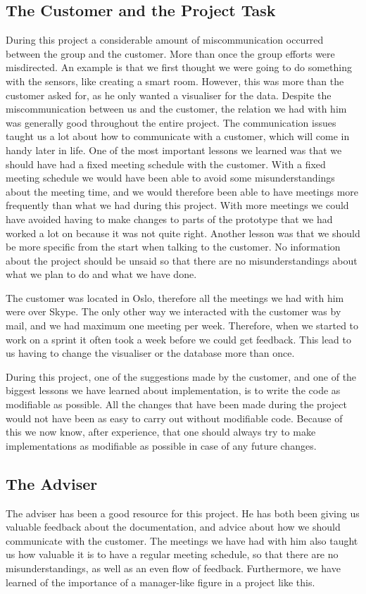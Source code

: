 \documentclass[../document]{subfiles}
\begin{document}
\subsection{The Customer and the Project Task}
During this project a considerable amount of miscommunication occurred between the group and the customer. More than once the group efforts were misdirected. An example is that we first thought we were going to do something with the sensors, like creating a smart room. However, this was more than the customer asked for, as he only wanted a visualiser for the data. Despite the miscommunication between us and the customer, the relation we had with him was generally good throughout the entire project. The communication issues taught us a lot about how to communicate with a customer, which will come in handy later in life. One of the most important lessons we learned was that we should have had a fixed meeting schedule with the customer. With a fixed meeting schedule we would have been able to avoid some misunderstandings about the meeting time, and we would therefore been able to have meetings more frequently than what we had during this project. With more meetings we could have avoided having to make changes to parts of the prototype that we had worked a lot on because it was not quite right. Another lesson was that we should be more specific from the start when talking to the customer. No information about the project should be unsaid so that there are no misunderstandings about what we plan to do and what we have done.   

The customer was located in Oslo, therefore all the meetings we had with him were over Skype. The only other way we interacted with the customer was by mail, and we had maximum one meeting per week. Therefore, when we started to work on a sprint it often took a week before we could get feedback. This lead to us having to change the visualiser or the database more than once. 

During this project, one of the suggestions made by the customer, and one of the biggest lessons we have learned about implementation, is to write the code as modifiable as possible. All the changes that have been made during the project would not have been as easy to carry out without modifiable code. Because of this we now know, after experience, that one should always try to make implementations as modifiable as possible in case of any future changes. 

\subsection{The Adviser}
The adviser has been a good resource for this project. He has both been giving us valuable feedback about the documentation, and advice about how we should communicate with the customer. The meetings we have had with him also taught us how valuable it is to have a regular meeting schedule, so that there are no misunderstandings, as well as an even flow of feedback. Furthermore, we have learned of the importance of a manager-like figure in a project like this.
\end{document}
